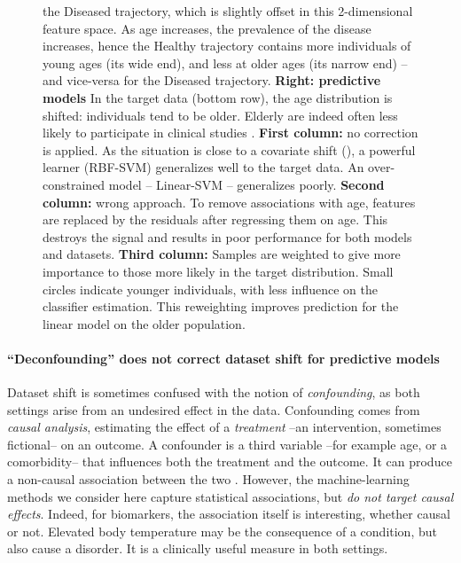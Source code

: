 \documentclass[twocolumn]{article}
\begin{document}
\begin{figure}[t!]
{  the Diseased trajectory, which is slightly offset in this 2-dimensional
  feature space. As age increases, the prevalence of the
  disease increases, hence the Healthy trajectory contains more
  individuals of
  young ages (its wide end), and less at older ages (its narrow end) -- and
  vice-versa for the Diseased trajectory.
  \textbf{Right: predictive models}
  In the target data (bottom row), the age distribution is shifted:
  individuals tend to be older. Elderly are indeed often less
  likely to participate in clinical studies \citep{heiat2002representation}.
  \textbf{First column:} no correction is applied. As the situation is close to
  a covariate shift (), a powerful learner (RBF-SVM)
  generalizes well to the target data. An over-constrained model -- Linear-SVM --
  generalizes poorly.
  \textbf{Second column:} wrong approach. To remove
  associations with age, features are replaced by the residuals after regressing
  them on age. This destroys the signal and results in poor performance for both
  models and datasets.
  \textbf{Third column:} Samples are weighted to
  give more importance to those more likely in the target
  distribution.  Small circles  indicate
  younger individuals, with less influence on the classifier estimation.
  This reweighting  improves prediction for the linear model on the older population.
}
\end{figure}


\paragraph{``Deconfounding'' does not correct dataset shift for
predictive models}
Dataset shift is sometimes confused with the notion of
\emph{confounding}, as both settings arise from an undesired effect in the data.
Confounding comes from \emph{causal analysis}, estimating
the effect of a \emph{treatment} --an intervention, sometimes fictional-- on an outcome.  A confounder is
a third variable --for example age, or a comorbidity-- that influences both the
treatment and the outcome. It can produce a non-causal association
between the two \citep[See][Chap. 7, for a precise definition]{hernan2020causal}.
%
However, the machine-learning methods we consider here capture statistical
associations, but \emph{do not target causal effects}.
%
Indeed, for biomarkers, the association itself is interesting, whether causal or not.
%
Elevated body temperature may be the consequence of a condition, but also
cause a disorder. It is a clinically useful measure in both settings.
\end{document}
